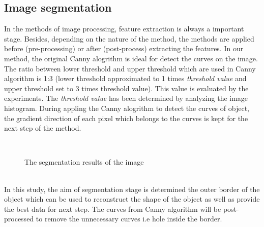\documentclass[twoside,twocolumn,10pt]{article}
\begin{document}
\subsection{Image segmentation}
In the methods of image processing, feature extraction is always a important stage. Besides, depending on the nature of the method, the methods are applied before (pre-processing) or after (post-process) extracting the features. In our method, the original Canny alogrithm\cite{canny} is ideal for detect the curves on the image. The ratio between lower threshold and upper threshold which are used in Canny algorithm is 1:3 (lower threshold approximated to 1 times \textit{threshold value} and upper threshold set to 3 times threshold value). This value is evaluated by the experiments. The \textit{threshold value} has been determined by analyzing the image histogram. During appling the Canny alogrithm to detect the curves of object, the gradient direction of each pixel which belongs to the curves is kept for the next step of the method. 
\begin{figure}[h]
\centering
{}~~
\caption{The segmentation results of the image}
\label{figparts}
\end{figure}~\\[0.2cm]
In this study, the aim of segmentation stage is determined the outer border of the object which can be used to reconstruct the shape of the object as well as provide the best data for next step. The curves from Canny algorithm will be post-processed to remove the unnecessary curves i.e hole inside the border. 
\end{document}
